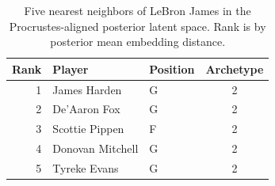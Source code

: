 \begin{table}[htbp]
  \centering\small
  \begin{tabular}{rllc}
    \toprule
    Rank & Player & Position & Archetype \\
    \midrule
    1 & James Harden & G & 2 \\
    2 & De'Aaron Fox & G & 2 \\
    3 & Scottie Pippen & F & 2 \\
    4 & Donovan Mitchell & G & 2 \\
    5 & Tyreke Evans & G & 2 \\
    \bottomrule
  \end{tabular}
  \caption{Five nearest neighbors of LeBron James in the Procrustes-aligned posterior latent space. Rank is by posterior mean embedding distance.}
  \label{tab:LeBron_James_neighbors}
\end{table}

